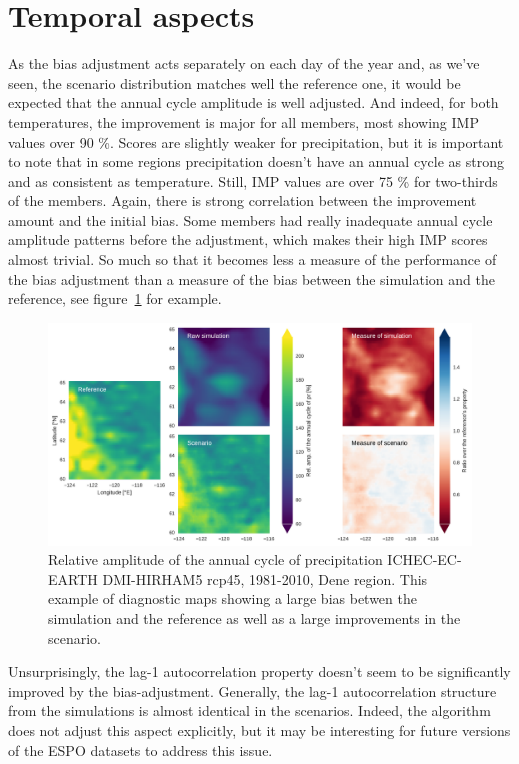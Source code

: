 \documentclass[letterpaper,10pt]{article}
\begin{document}
\section{Temporal aspects}
As the bias adjustment acts separately on each day of the year and, as we've seen, the scenario distribution matches well the reference one, it would be expected that the annual cycle amplitude is well adjusted. And indeed, for both temperatures, the improvement is major for all members, most showing IMP values over 90 \%. Scores are slightly weaker for precipitation, but it is important to note that in some regions precipitation doesn't have an annual cycle as strong and as consistent as temperature. Still, IMP values are over 75 \% for two-thirds of the members. Again, there is strong correlation between the improvement amount and the initial bias. Some members had really inadequate annual cycle amplitude patterns before the adjustment, which makes their high IMP scores almost trivial. So much so that it becomes less a measure of the performance of the bias adjustment than a measure of the bias between the simulation and the reference, see figure~\ref{fig:acapr} for example.

\begin{figure}
\includegraphics[width=\textwidth]{../images/aca_pr_diags.pdf}
\caption{Relative amplitude of the annual cycle of precipitation ICHEC-EC-EARTH DMI-HIRHAM5 rcp45, 1981-2010, Dene region. This example of diagnostic maps showing a large bias betwen the simulation and the reference as well as a large improvements in the scenario.}\label{fig:acapr}
\end{figure}


Unsurprisingly, the lag-1 autocorrelation property doesn't seem to be significantly improved by the bias-adjustment. Generally, the lag-1 autocorrelation structure from the simulations is almost identical in the scenarios. Indeed, the algorithm does not adjust this aspect explicitly, but it may be interesting for future versions of the ESPO datasets to address this issue.
\end{document}
